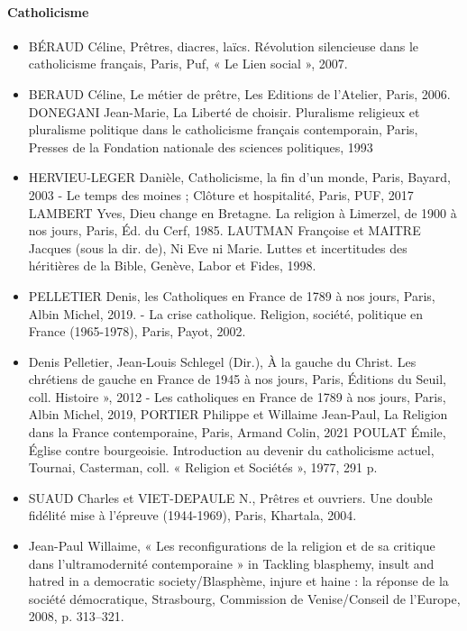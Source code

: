 \paragraph{Catholicisme}
\begin{itemize}  
\item BÉRAUD Céline, Prêtres, diacres, laïcs. Révolution silencieuse dans le catholicisme  français, Paris, Puf, « Le Lien social », 2007. 
\item BERAUD Céline, Le métier de prêtre, Les Editions de l’Atelier, Paris, 2006. DONEGANI Jean-Marie, La Liberté de choisir. Pluralisme religieux et pluralisme politique  dans le catholicisme français contemporain, Paris, Presses de la Fondation nationale des sciences politiques, 1993  
\item HERVIEU-LEGER Danièle, Catholicisme, la fin d’un monde, Paris, Bayard, 2003 - Le temps des moines ; Clôture et hospitalité, Paris, PUF, 2017 LAMBERT Yves, Dieu change en Bretagne. La religion à Limerzel, de 1900 à nos jours,  Paris, Éd. du Cerf, 1985. LAUTMAN Françoise et MAITRE Jacques (sous la dir. de), Ni Eve ni Marie. Luttes et  incertitudes des héritières de la Bible,  Genève, Labor et Fides, 1998. 
\item PELLETIER Denis, les Catholiques en France de 1789 à nos jours, Paris, Albin Michel, 2019. - La crise catholique. Religion, société, politique en France (1965-1978), Paris, Payot, 2002. 
\item  Denis Pelletier, Jean-Louis Schlegel (Dir.), À la gauche du Christ. Les chrétiens de gauche en France de 1945 à nos jours, Paris, Éditions du Seuil, coll.  Histoire », 2012 - Les catholiques en France de 1789 à nos jours, Paris, Albin Michel, 2019,  PORTIER Philippe et Willaime Jean-Paul, La Religion dans la France contemporaine,   Paris, Armand Colin, 2021 POULAT Émile, Église contre bourgeoisie. Introduction au devenir du catholicisme actuel,  Tournai, Casterman, coll. « Religion et Sociétés », 1977, 291 p. 
\item SUAUD Charles et VIET-DEPAULE N., Prêtres et ouvriers. Une double fidélité mise à  l’épreuve (1944-1969), Paris, Khartala, 2004. 
\item Jean-Paul Willaime, « Les reconfigurations de la religion et de sa critique dans l’ultramodernité contemporaine » in Tackling blasphemy, insult and hatred in a democratic society/Blasphème, injure et haine : la réponse de la société démocratique, Strasbourg, Commission de Venise/Conseil de l’Europe, 2008, p. 313–321. 

\end{itemize}
